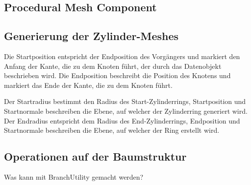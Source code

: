 \subsection{Procedural Mesh Component}

\subsection{Generierung der Zylinder-Meshes} \label{subsec:ZylinderMeshes}

Die Startposition entspricht der Endposition des Vorgängers und markiert den Anfang der Kante, die zu dem Knoten führt, der durch das Datenobjekt beschrieben wird. Die Endposition beschreibt die Position des Knotens und markiert das Ende der Kante, die zu dem Knoten führt. 

Der Startradius bestimmt den Radius des Start-Zylinderrings, Startposition und Startnormale beschreiben die Ebene, auf welcher der Zylinderring generiert wird. Der Endradius entspricht dem Radius des End-Zylinderrings, Endposition und Startnormale beschreiben die Ebene, auf welcher der Ring erstellt wird.

\subsection{Operationen auf der Baumstruktur}

Was kann mit BranchUtility gemacht werden?
